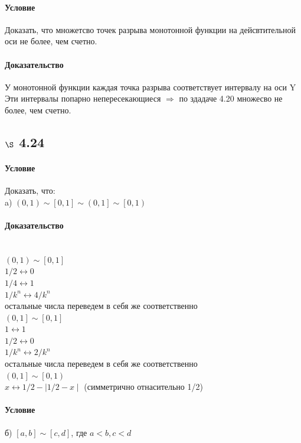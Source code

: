 \documentclass[a4paper,12pt]{article}
\begin{document}
\paragraph*{Условие}
Доказать, что множетсво точек разрыва монотонной функции на дейсвтительной оси не более, чем счетно.
\paragraph*{Доказательство}
У монотонной функции каждая точка разрыва соответствует интервалу на оси Y\\
Эти интервалы попарно непересекающиеся $\Rightarrow$ по здадаче 4.20 множесво не более, чем счетно.

\subsection*{$\S$ 4.24}
\paragraph*{Условие}
Доказать, что:\\
a) $\left( 0, 1\right)  \sim \left[  0, 1 \right]  \sim \left(  0, 1 \right]  \sim \left[  0, 1 \right) $\\
\paragraph*{Доказательство}\mbox{}\\
$\left( 0, 1\right)  \sim \left[  0, 1 \right]$\\
$1/2 \leftrightarrow 0$\\
$1/4 \leftrightarrow 1$\\
$1/k^n \leftrightarrow 4/k^n$\\
остальные числа переведем в себя же соответственно\\
$\left(  0, 1 \right]  \sim \left[  0, 1 \right]$\\
$1 \leftrightarrow 1$\\
$1/2 \leftrightarrow 0$\\
$1/k^n \leftrightarrow 2/k^n$\\
остальные числа переведем в себя же соответственно\\
$\left(  0, 1 \right]  \sim \left[  0, 1 \right)$\\
$x \leftrightarrow 1/2 - \mid 1/2 - x \mid$ (симметрично отнасительно 1/2)
\paragraph*{Условие}
б) $\left[ a, b \right]  \sim \left[  c, d \right] $, где $a < b, c < d$\\
\end{document}

